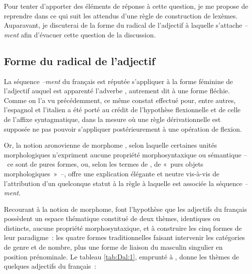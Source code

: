 \documentclass[output=paper]{langsci/langscibook}
\begin{document}
Pour tenter d'apporter des éléments de réponse à cette question, je me propose de reprendre dans ce qui suit les attendus d'une règle de construction de lexèmes. Auparavant, je discuterai de la forme du radical de l'adjectif à laquelle s'attache \emph{--ment} afin d'évacuer cette question de la discussion\emph{.}

\subsection{Forme du radical de l'adjectif}\label{section:dal:3.1}

La séquence \emph{--ment} du français est réputée s'appliquer à la forme féminine de l'adjectif auquel est apparenté l'adverbe %
\citep[cf. entre autres ][28--29]{Guimier96a,Molinier00}%
%
, autrement dit à une forme fléchie. Comme on l'a vu précédemment, ce même constat effectué pour, entre autres, l'espagnol et l'italien a été porté au crédit de l'hypothèse flexionnelle et de celle de l'affixe syntagmatique, dans la mesure où une règle dérivationnelle est supposée ne pas pouvoir s'appliquer postérieurement à une opération de flexion.

Or, la notion aronovienne de morphome %
\citep{Aronoff94}%
%
, selon laquelle certaines unités morphologiques n'expriment aucune propriété morphosyntaxique ou sémantique --~ce sont de pures formes, ou, selon les termes de %
\citet[82]{Bonami05}%
%
, de «~purs objets morphologiques~»~--, offre une explication élégante et neutre vis-à-vis de l'attribution d'un quelconque statut à la règle à laquelle est associée la séquence \emph{--ment}.

Recourant à la notion de morphome, %
\citet{Bonami05} %
%
font l'hypothèse que les adjectifs du français possèdent un espace thématique constitué de deux thèmes, identiques ou distincts,  aucune propriété morphosyntaxique, et  %
à construire les cinq formes de leur paradigme~: les quatre formes traditionnelles faisant intervenir les catégories de genre et de nombre, plus une forme de liaison du masculin singulier en position prénominale. Le tableau \ref{tab:Dal:1}, emprunté à %
\citet{Bonami05}%
%
, donne les thèmes de quelques adjectifs du français~:
\end{document}

